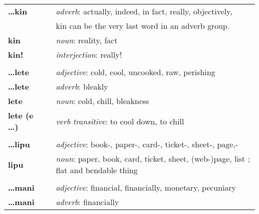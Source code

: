 \begin{supertabular}{p{2,5cm}|ll}
    \textbf{\dots kin}        &  & \textit{adverb}: actually, indeed, in fact, really, objectively,                            \\ && kin can be the very last word in an adverb group. \\%
    \textbf{kin}              &  & \textit{noun}: reality, fact                                                                \\  %
    \textbf{kin!}             &  & \textit{interjection}: really!                                                              \\ %
                              &  &                                                                                             \\ %
    \textbf{\dots lete}       &  & \textit{adjective}: cold, cool, uncooked, raw, perishing                                    \\ %
    \textbf{\dots lete}       &  & \textit{adverb}: bleakly                                                                    \\ %
    \textbf{lete}             &  & \textit{noun}: cold, chill, bleakness                                                       \\ %
    \textbf{lete (e \dots)}   &  & \textit{verb transitive}: to cool down, to chill                                            \\ %
                              &  &                                                                                             \\ %
    \textbf{\dots lipu}       &  & \textit{adjective}: book-, paper-, card-, ticket-, sheet-, page,-                           \\ %
    \textbf{lipu}             &  & \textit{noun}: paper, book, card, ticket, sheet, (web-)page, list ; flat and bendable thing \\ %
                              &  &                                                                                             \\ %
    \textbf{\dots mani}       &  & \textit{adjective}: financial, financially, monetary, pecuniary                             \\ %
    \textbf{\dots mani}       &  & \textit{adverb}: financially                                                                \\ %

\end{supertabular}
